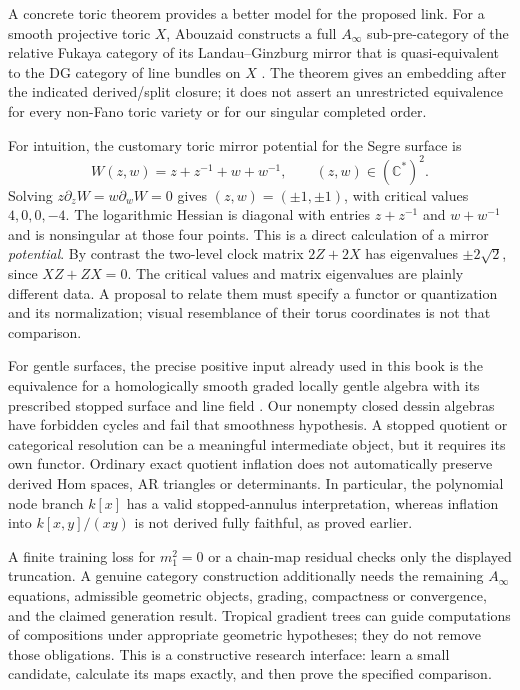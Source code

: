 \documentclass[11pt,oneside,openany]{book}
\theoremstyle{definition}\newtheorem{definition}[theorem]{Definition}
\theoremstyle{remark}\newtheorem{remark}[theorem]{Remark}
\newcommand{\C}{\mathbb C}\newcommand{\Z}{\mathbb Z}\newcommand{\R}{\mathbb R}
\begin{document}
A concrete toric theorem provides a better model for the proposed link.
For a smooth projective toric $X$, Abouzaid constructs a full
$A_\infty$ sub-pre-category of the relative Fukaya category of its
Landau--Ginzburg mirror that is quasi-equivalent to the DG category of
line bundles on $X$ \cite[Theorem 1.2 and Corollary 1.4]{TGAbouzaid}.
The theorem gives an embedding after the indicated derived/split closure;
it does not assert an unrestricted equivalence for every non-Fano toric
variety or for our singular completed order.

For intuition, the customary toric mirror potential for the Segre surface
is
\[
 W(z,w)=z+z^{-1}+w+w^{-1},\qquad (z,w)\in(\C^*)^2.
\]
Solving $z\partial_zW=w\partial_wW=0$ gives
$(z,w)=(\pm1,\pm1)$, with critical values $4,0,0,-4$.
The logarithmic Hessian is diagonal with entries $z+z^{-1}$ and
$w+w^{-1}$ and is nonsingular at those four points. This is a direct
calculation of a mirror \emph{potential}. By contrast the two-level clock
matrix $2Z+2X$ has eigenvalues $\pm2\sqrt2$, since $XZ+ZX=0$.
The critical values and matrix eigenvalues are plainly different data.
A proposal to relate them must specify a functor or quantization and its
normalization; visual resemblance of their torus coordinates is not that
comparison.

For gentle surfaces, the precise positive input already used in this
book is the equivalence for a homologically smooth graded locally gentle
algebra with its prescribed stopped surface and line field
\cite[Theorem 3.2.2]{LekiliPolishchuk}. Our nonempty closed dessin algebras
have forbidden cycles and fail that smoothness hypothesis. A stopped
quotient or categorical resolution can be a meaningful intermediate
object, but it requires its own functor. Ordinary exact quotient
inflation does not automatically preserve derived Hom spaces, AR
triangles or determinants. In particular, the polynomial node branch
$k[x]$ has a valid stopped-annulus interpretation, whereas inflation into
$k[x,y]/(xy)$ is not derived fully faithful, as proved earlier.

A finite training loss for $m_1^2=0$ or a chain-map residual checks only
the displayed truncation. A genuine category construction additionally
needs the remaining $A_\infty$ equations, admissible geometric objects,
grading, compactness or convergence, and the claimed generation result.
Tropical gradient trees can guide computations of compositions under
appropriate geometric hypotheses; they do not remove those obligations.
This is a constructive research interface: learn a small candidate,
calculate its maps exactly, and then prove the specified comparison.
\end{document}
